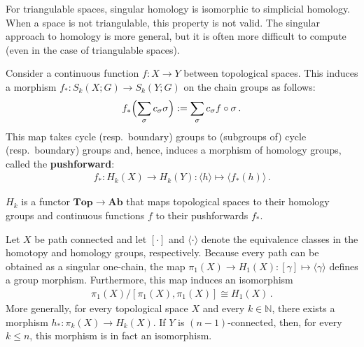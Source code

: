     \begin{property}
        For triangulable spaces, singular homology is isomorphic to simplicial homology. When a space is not triangulable, this property is not valid. The singular approach to homology is more general, but it is often more difficult to compute (even in the case of triangulable spaces).
    \end{property}

    \begin{property}\label{topology:pushforward}
        Consider a continuous function $f:X\rightarrow Y$ between topological spaces. This induces a morphism $f_*:S_k(X;G)\rightarrow S_k(Y;G)$ on the chain groups as follows:
        \begin{gather}
            f_*\Bigl(\sum_\sigma c_\sigma\sigma\Bigr) := \sum_\sigma c_\sigma f\circ\sigma\,.
        \end{gather}
        This map takes cycle (resp.~boundary) groups to (subgroups of) cycle (resp.~boundary) groups and, hence, induces a morphism of homology groups, called the \textbf{pushforward}:
        \begin{gather}
            f_\ast:H_k(X)\rightarrow H_k(Y):\langle h \rangle\mapsto\langle f_*(h)\rangle\,.
        \end{gather}
    \end{property}
    \begin{result}
        $H_k$ is a functor $\mathbf{Top}\rightarrow\mathbf{Ab}$ that maps topological spaces to their homology groups and continuous functions $f$ to their pushforwards $f_\ast$.
    \end{result}

    \begin{theorem}[Hurewicz]
        Let $X$ be path connected and let $[\cdot]$ and $\langle\cdot\rangle$ denote the equivalence classes in the homotopy and homology groups, respectively. Because every path can be obtained as a singular one-chain, the map $\pi_1(X)\rightarrow H_1(X):[\gamma]\mapsto\langle\gamma\rangle$ defines a group morphism. Furthermore, this map induces an isomorphism 
        \begin{gather}
            \pi_1(X)/[\pi_1(X),\pi_1(X)] \cong H_1(X)\,.
        \end{gather}
        More generally, for every topological space $X$ and every $k\in\mathbb{N}$, there exists a morphism $h_*:\pi_k(X)\rightarrow H_k(X)$. If $Y$ is $(n-1)$-connected, then, for every $k\leq n$, this morphism is in fact an isomorphism.
    \end{theorem}


